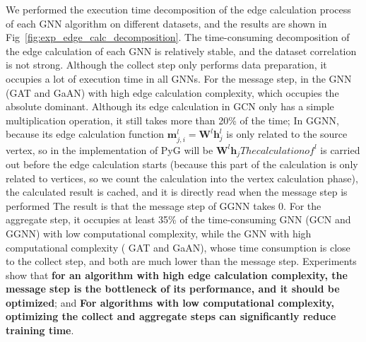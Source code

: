 We performed the execution time decomposition of the edge calculation process of each GNN algorithm on different datasets,
and the results are shown in Fig~\ref{fig:exp_edge_calc_decomposition}.
The time-consuming decomposition of the edge calculation of each GNN is relatively stable, 
and the dataset correlation is not strong. Although the collect step only performs data preparation,
it occupies a lot of execution time in all GNNs. For the message step, in the GNN (GAT and GaAN) with high edge calculation complexity, 
which occupies the absolute dominant. Although its edge calculation in GCN only has a simple multiplication operation, it still takes more than 20\% of the time; 
In GGNN, because its edge calculation function $\boldsymbol{m}_{j,i }^l=\boldsymbol{W}^l\boldsymbol{h}_{j}^l$ is only related to the source vertex, 
so in the implementation of PyG will be $\boldsymbol{W}^l\boldsymbol{h}_j The calculation of ^l$ is carried out before the edge calculation starts
(because this part of the calculation is only related to vertices, so we count the calculation into the vertex calculation phase),
the calculated result is cached, and it is directly read when the message step is performed The result is that the message step of GGNN takes 0.
For the aggregate step, it occupies at least 35\% of the time-consuming GNN (GCN and GGNN) with low computational complexity,
while the GNN with high computational complexity ( GAT and GaAN), whose time consumption is close to the collect step,
and both are much lower than the message step. Experiments show that \textbf{for an algorithm with high edge calculation complexity,
the message step is the bottleneck of its performance, and it should be optimized}; and \textbf{For algorithms with low computational complexity,
optimizing the collect and aggregate steps can significantly reduce training time}.

